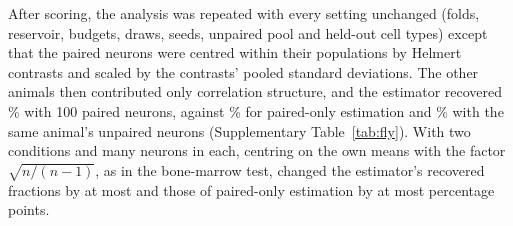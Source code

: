 After scoring, the analysis was repeated with every setting unchanged (folds, reservoir, budgets, draws, seeds, unpaired pool and held-out cell types) except that the paired neurons were centred within their populations by Helmert contrasts and scaled by the contrasts' pooled standard deviations. The other animals then contributed only correlation structure, and the estimator recovered \FxOwnHundred\% with 100 paired neurons, against \FxPairedOwnHundred\% for paired-only estimation and \FxSameHundred\% with the same animal's unpaired neurons (Supplementary Table~\ref{tab:fly}). With two conditions and many neurons in each, centring on the own means with the factor $\sqrt{n/(n-1)}$, as in the bone-marrow test, changed the estimator's recovered fractions by at most \FxDiffProposed{} and those of paired-only estimation by at most \FxDiffPaired{} percentage points.

\begin{table}[h]
\caption{\textbf{Female fly connectome with unpaired neurons of other animals.} Recovered fraction (\%) of the dependence between brain and nerve-cord wiring in held-out neuron types, by budget of paired neurons (averaged over five draws). Centred on its or their averages: paired neurons centred and scaled by the unpaired pool's statistics (for the same animal, the benchmark; for other animals, the prespecified secondary analysis); centred by contrasts: by Helmert contrasts (after scoring). Paired neurons only, the best of the paired-only estimators at each budget.}
\label{tab:fly}
\centering\footnotesize

\end{table}

